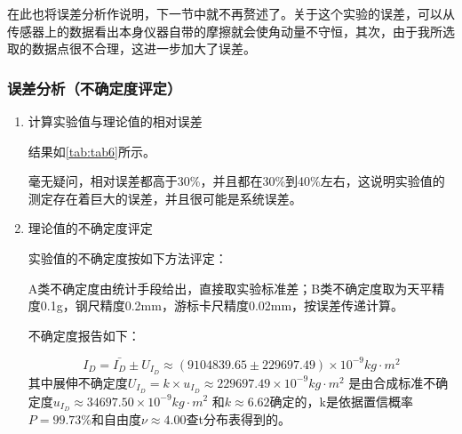 \documentclass[dvipsnames, svgnames,a4paper,11pt]{article}
\begin{document}
\begin{enumerate}
\begin{itemize}
			在此也将误差分析作说明，下一节中就不再赘述了。关于这个实验的误差，可以从传感器上的数据看出本身仪器自带的摩擦就会使角动量不守恒，其次，由于我所选取的数据点很不合理，这进一步加大了误差。
		\end{itemize}
	\end{enumerate}
	
	\subsubsection{误差分析（不确定度评定）}
	\begin{enumerate}
		\item 计算实验值与理论值的相对误差
		
		结果如\cref{tab:tab6}所示。
		
		\begin{table}[htbp]
			\centering
			\caption{相对误差}
			\label{tab:tab6}
		\end{table}
		
		毫无疑问，相对误差都高于30\%，并且都在30\%到40\%左右，这说明实验值的测定存在着巨大的误差，并且很可能是系统误差。
		
		\item 理论值的不确定度评定
		
		实验值的不确定度按如下方法评定：
		
		A类不确定度由统计手段给出，直接取实验标准差；B类不确定度取为天平精度0.1g，钢尺精度0.2mm，游标卡尺精度0.02mm，按误差传递计算。
		
		不确定度报告如下：
		
		\begin{equation*}
			I_D=\bar{I_D}\pm U_{I_D}\approx( 9104839.65 \pm  229697.49 )\times10^{-9}kg\cdot m^2
		\end{equation*} 
		其中展伸不确定度$U_{I_D}={k}\times{u_{I_D}}\approx 229697.49 \times10^{-9}kg\cdot m^2$ 是由合成标准不确定度$u_{I_D}\approx 34697.50 \times10^{-9}kg\cdot m^2$ 和$k\approx6.62$确定的，k是依据置信概率$P=99.73\%$和自由度$\nu\approx4.00$查t分布表得到的。
		

\end{enumerate}
\end{document}
